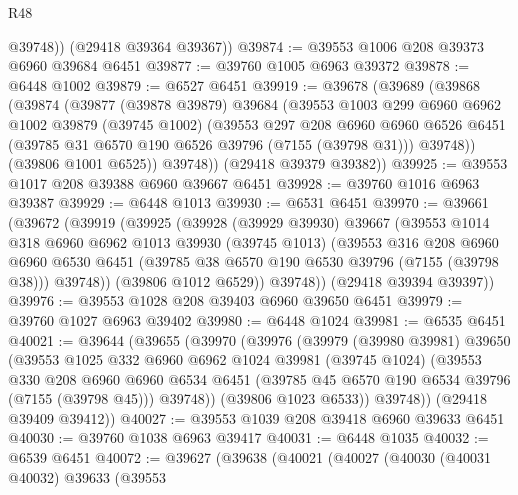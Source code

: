 \begin{lexlean}{R48}
\begin{coremodule}
          @39748))
      (@29418 @39364 @39367))
@39874 := @39553 @1006 @208 @39373 @6960 @39684 @6451
@39877 := @39760 @1005 @6963 @39372
@39878 := @6448 @1002
@39879 := @6527 @6451
@39919 := @39678
    (@39689
      (@39868
        (@39874
          (@39877
            (@39878 @39879)
            @39684
            (@39553
              @1003
              @299
              @6960
              @6962
              @1002
              @39879
              (@39745 @1002)
              (@39553
                @297
                @208
                @6960
                @6960
                @6526
                @6451
                (@39785 @31 @6570 @190 @6526 @39796 (@7155 (@39798 @31)))
                @39748))
            (@39806 @1001 @6525))
          @39748))
      (@29418 @39379 @39382))
@39925 := @39553 @1017 @208 @39388 @6960 @39667 @6451
@39928 := @39760 @1016 @6963 @39387
@39929 := @6448 @1013
@39930 := @6531 @6451
@39970 := @39661
    (@39672
      (@39919
        (@39925
          (@39928
            (@39929 @39930)
            @39667
            (@39553
              @1014
              @318
              @6960
              @6962
              @1013
              @39930
              (@39745 @1013)
              (@39553
                @316
                @208
                @6960
                @6960
                @6530
                @6451
                (@39785 @38 @6570 @190 @6530 @39796 (@7155 (@39798 @38)))
                @39748))
            (@39806 @1012 @6529))
          @39748))
      (@29418 @39394 @39397))
@39976 := @39553 @1028 @208 @39403 @6960 @39650 @6451
@39979 := @39760 @1027 @6963 @39402
@39980 := @6448 @1024
@39981 := @6535 @6451
@40021 := @39644
    (@39655
      (@39970
        (@39976
          (@39979
            (@39980 @39981)
            @39650
            (@39553
              @1025
              @332
              @6960
              @6962
              @1024
              @39981
              (@39745 @1024)
              (@39553
                @330
                @208
                @6960
                @6960
                @6534
                @6451
                (@39785 @45 @6570 @190 @6534 @39796 (@7155 (@39798 @45)))
                @39748))
            (@39806 @1023 @6533))
          @39748))
      (@29418 @39409 @39412))
@40027 := @39553 @1039 @208 @39418 @6960 @39633 @6451
@40030 := @39760 @1038 @6963 @39417
@40031 := @6448 @1035
@40032 := @6539 @6451
@40072 := @39627
    (@39638
      (@40021
        (@40027
          (@40030
            (@40031 @40032)
            @39633
            (@39553

\end{coremodule}
\end{lexlean}
